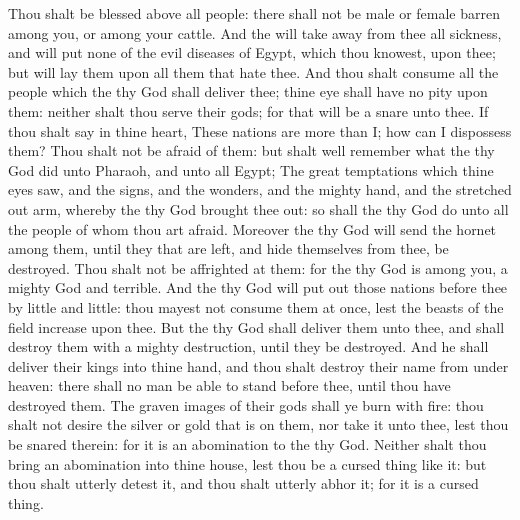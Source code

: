 \begin{biblechapter}
\verse Thou shalt be blessed above all people: there shall not be male or female barren among you, or among your cattle.
\verse And the \LORD will take away from thee all sickness, and will put none of the evil diseases of Egypt, which thou knowest, upon thee; but will lay them upon all them that hate thee.
\verse And thou shalt consume all the people which the \LORD thy God shall deliver thee; thine eye shall have no pity upon them: neither shalt thou serve their gods; for that will be a snare unto thee.
\verse If thou shalt say in thine heart, These nations are more than I; how can I dispossess them?
\verse Thou shalt not be afraid of them: but shalt well remember what the \LORD thy God did unto Pharaoh, and unto all Egypt;
\verse The great temptations which thine eyes saw, and the signs, and the wonders, and the mighty hand, and the stretched out arm, whereby the \LORD thy God brought thee out: so shall the \LORD thy God do unto all the people of whom thou art afraid.
\verse Moreover the \LORD thy God will send the hornet among them, until they that are left, and hide themselves from thee, be destroyed.
\verse Thou shalt not be affrighted at them: for the \LORD thy God is among you, a mighty God and terrible.
\verse And the \LORD thy God will put out those nations before thee by little and little: thou mayest not consume them at once, lest the beasts of the field increase upon thee.
\verse But the \LORD thy God shall deliver them unto thee, and shall destroy them with a mighty destruction, until they be destroyed.
\verse And he shall deliver their kings into thine hand, and thou shalt destroy their name from under heaven: there shall no man be able to stand before thee, until thou have destroyed them.
\verse The graven images of their gods shall ye burn with fire: thou shalt not desire the silver or gold that is on them, nor take it unto thee, lest thou be snared therein: for it is an abomination to the \LORD thy God.
\verse Neither shalt thou bring an abomination into thine house, lest thou be a cursed thing like it: but thou shalt utterly detest it, and thou shalt utterly abhor it; for it is a cursed thing.
\end{biblechapter}

